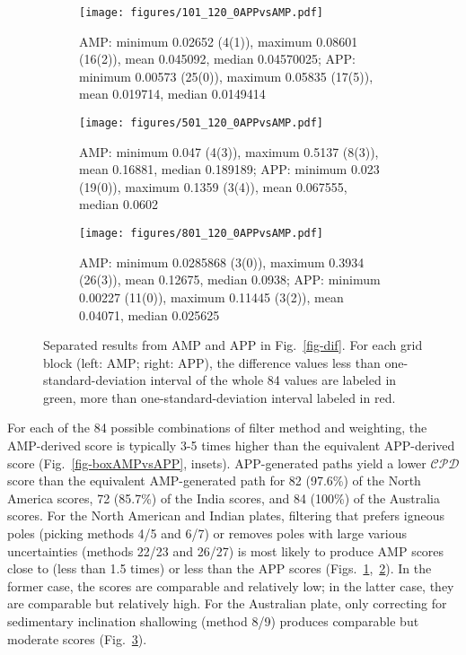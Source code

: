 \begin{figure*}
	\centering
	\begin{subfigure}{1.01\textwidth}
		\texttt{[image: figures/101\_120\_0APPvsAMP.pdf]}
		\caption{AMP: minimum 0.02652 (4(1)), maximum 0.08601 (16(2)), mean
		0.045092, median 0.04570025; APP: minimum 0.00573 (25(0)), maximum
		0.05835 (17(5)), mean 0.019714, median 0.0149414}\label{fig-na-difAMPvsAPP}
	\end{subfigure}
	\vspace{.1em}
	\begin{subfigure}{1.01\textwidth}
		\texttt{[image: figures/501\_120\_0APPvsAMP.pdf]}
		\caption{AMP: minimum 0.047 (4(3)), maximum 0.5137 (8(3)), mean
		0.16881, median 0.189189; APP: minimum 0.023 (19(0)), maximum 0.1359
		(3(4)), mean 0.067555, median 0.0602}\label{fig-in-difAMPvsAPP}
	\end{subfigure}
	\vspace{.1em}
	\begin{subfigure}{1.01\textwidth}
		\texttt{[image: figures/801\_120\_0APPvsAMP.pdf]}
		\caption{AMP: minimum 0.0285868 (3(0)), maximum 0.3934 (26(3)), mean
		0.12675, median 0.0938; APP: minimum 0.00227 (11(0)), maximum 0.11445
		(3(2)), mean 0.04071, median 0.025625}\label{fig-au-difAMPvsAPP}
	\end{subfigure}
	\caption[Differences of each plate's paleomagnetic APWPs versus its FHM
predicted APWP (AMP vs APP)]{Separated results from AMP and APP in
Fig.~\ref{fig-dif}. For each grid block (left: AMP; right: APP), the difference
values less than one-standard-deviation interval of the whole 84 values are
labeled in green, more than one-standard-deviation interval labeled in
red.}\label{fig-difAMPvsAPP}
\end{figure*}

For each of the 84 possible combinations of filter method and weighting, the
AMP-derived score is typically 3-5 times higher than the equivalent APP-derived
score (Fig.~\ref{fig-boxAMPvsAPP}, insets). APP-generated paths yield a lower
$\mathcal{CPD}$ score than the equivalent AMP-generated path for 82 (97.6\%) of
the North America scores, 72 (85.7\%) of the India scores, and 84 (100\%) of the
Australia scores. For the North American and Indian plates, filtering that
prefers igneous poles (picking methods 4/5 and 6/7) or removes poles with large
various uncertainties (methods 22/23 and 26/27) is most likely to produce AMP
scores close to (less than 1.5 times) or less than the APP scores
(Figs.~\ref{fig-na-difAMPvsAPP},~\ref{fig-in-difAMPvsAPP}). In the former case,
the scores are comparable and relatively low; in the latter case, they are
comparable but relatively high. For the Australian plate, only correcting for
sedimentary inclination shallowing (method 8/9) produces comparable but moderate
scores (Fig.~\ref{fig-au-difAMPvsAPP}).

